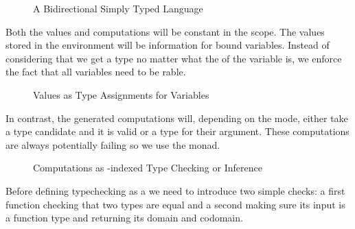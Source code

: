 \begin{figure}[h]
\begin{minipage}{0.4\textwidth}
\end{minipage}\begin{minipage}{0.6\textwidth}
\end{minipage}
\caption{A Bidirectional Simply Typed Language}
\end{figure}

Both the values and computations will be constant in the scope. The values stored
in the environment will be  information for bound variables. Instead of
considering that we get a type no matter what the  of the variable is,
we enforce the fact that all variables need to be rable.

\begin{figure}[h]
\caption{Values as Type Assignments for Variables}
\end{figure}

In contrast, the generated computations will, depending on the mode, either take a
type candidate and  it is valid or  a type for their argument.
These computations are always potentially failing so we use the  monad.

\begin{figure}[h]
\caption{Computations as -indexed Type Checking or Inference}
\end{figure}

Before defining typechecking as a  we need to introduce two simple
checks: a first function checking that two types are equal and a second making
sure its input is a function type and returning its domain and codomain.

\begin{figure}[h]
\begin{minipage}{0.5\textwidth}
\end{minipage}
\begin{minipage}{0.5\textwidth}
\end{minipage}
\end{figure}

